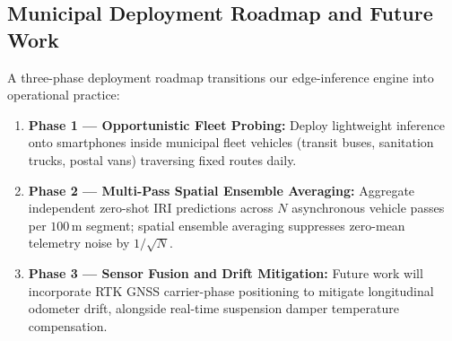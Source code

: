\documentclass[conference]{IEEEtran}
\begin{document}
\subsection{Municipal Deployment Roadmap and Future Work}
A three-phase deployment roadmap transitions our edge-inference engine into operational practice:
\begin{enumerate}
    \item \textbf{Phase 1 — Opportunistic Fleet Probing:} Deploy lightweight inference onto smartphones inside municipal fleet vehicles (transit buses, sanitation trucks, postal vans) traversing fixed routes daily.
    \item \textbf{Phase 2 — Multi-Pass Spatial Ensemble Averaging:} Aggregate independent zero-shot IRI predictions across $N$ asynchronous vehicle passes per $100\,\text{m}$ segment; spatial ensemble averaging suppresses zero-mean telemetry noise by $1/\sqrt{N}$.
    \item \textbf{Phase 3 — Sensor Fusion and Drift Mitigation:} Future work will incorporate RTK GNSS carrier-phase positioning to mitigate longitudinal odometer drift, alongside real-time suspension damper temperature compensation.
\end{enumerate}
\end{document}
